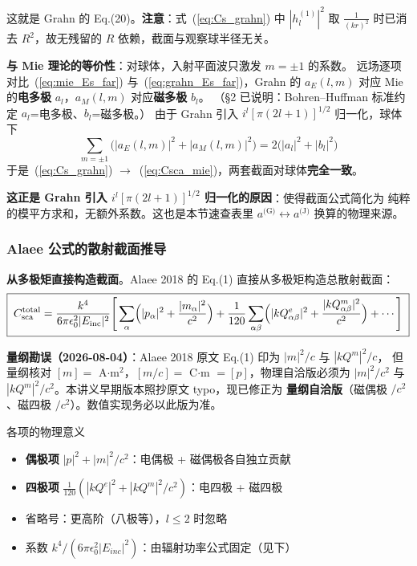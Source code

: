 这就是 Grahn 的 Eq.(20)。\textbf{注意}：式~(\ref{eq:Cs_grahn}) 中 $|h_l^{(1)}|^2$ 取
$\frac{1}{(kr)^2}$ 时已消去 $R^2$，故无残留的 $R$ 依赖，截面与观察球半径无关。

\textbf{与 Mie 理论的等价性}：对球体，入射平面波只激发 $m=\pm1$ 的系数。
远场逐项对比~(\ref{eq:mie_Es_far}) 与~(\ref{eq:grahn_Es_far})，Grahn 的 $a_E(l,m)$
对应 Mie 的\textbf{电多极} $a_l$，$a_M(l,m)$ 对应\textbf{磁多极} $b_l$。
（\S2 已说明：Bohren--Huffman 标准约定 $a_l$=电多极、$b_l$=磁多极。）
由于 Grahn 引入 $i^l[\pi(2l+1)]^{1/2}$ 归一化，球体下
\begin{equation}
  \sum_{m=\pm1}\bigl(|a_E(l,m)|^2 + |a_M(l,m)|^2\bigr) = 2\bigl(|a_l|^2 + |b_l|^2\bigr)
\end{equation}
于是~(\ref{eq:Cs_grahn}) $\to$~(\ref{eq:Csca_mie})，两套截面对球体\textbf{完全一致}。
\begin{noteworthy}
\textbf{这正是 Grahn 引入 $i^l[\pi(2l+1)]^{1/2}$ 归一化的原因}：使得截面公式简化为
纯粹的模平方求和，无额外系数。这也是本节速查表里 $a^{\text{(G)}}\leftrightarrow a^{\text{(J)}}$
换算的物理来源。
\end{noteworthy}

\subsubsection{Alaee 公式的散射截面推导}

\textbf{从多极矩直接构造截面}。Alaee 2018 的 Eq.(1) 直接从多极矩构造总散射截面：
\begin{equation}
  \boxed{\;
  C_{\text{sca}}^{\text{total}} = \frac{k^4}{6\pi\epsilon_0^2|E_{\text{inc}}|^2}
  \Bigg[\sum_\alpha\Bigl(|p_\alpha|^2 + \frac{|m_\alpha|^2}{c^2}\Bigr)
  + \frac{1}{120}\sum_{\alpha\beta}\Bigl(
    |kQ^e_{\alpha\beta}|^2 + \frac{|kQ^m_{\alpha\beta}|^2}{c^2}\Bigr) + \cdots\Bigg]
  \;}
  \label{eq:Csca_alaee}
\end{equation}

\begin{noteworthy}
\textbf{量纲勘误（2026-08-04）}：Alaee 2018 原文 Eq.(1) 印为 $|m|^2/c$ 与 $|kQ^m|^2/c$，
但量纲核对 $[m]=$ A$\cdot$m$^2$，$[m/c]=$ C$\cdot$m $=[p]$，物理自洽版必须为
$|m|^2/c^2$ 与 $|kQ^m|^2/c^2$。本讲义早期版本照抄原文 typo，现已修正为
\textbf{量纲自洽版}（磁偶极 $/c^2$、磁四极 $/c^2$）。数值实现务必以此版为准。
\end{noteworthy}

\begin{stepbox}{各项的物理意义}
\begin{itemize}
  \item \textbf{偶极项} $|p|^2 + |m|^2/c^2$：电偶极 + 磁偶极各自独立贡献
  \item \textbf{四极项} $\frac{1}{120}(|kQ^e|^2 + |kQ^m|^2/c^2)$：电四极 + 磁四极
  \item 省略号：更高阶（八极等），$l\le2$ 时忽略
  \item 系数 $k^4/(6\pi\epsilon_0^2|E_{inc}|^2)$：由辐射功率公式固定（见下）
\end{itemize}
\end{stepbox}

